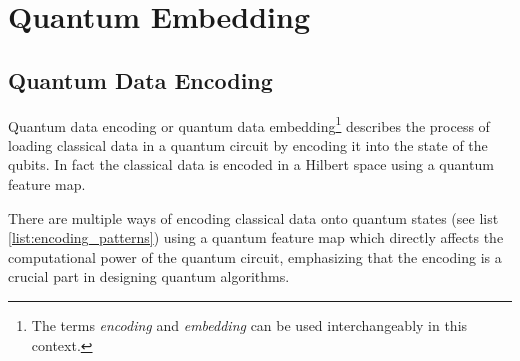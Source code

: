 
\chapter{Quantum Embedding}
\label{chapter:quantum_embedding} %






\section{Quantum Data Encoding}\label{section:quantum_data_encoding}
Quantum data encoding or quantum data embedding\footnote{The terms \textit{encoding} and \textit{embedding} can be used interchangeably in this context.} describes the process of loading classical data in a quantum circuit by encoding it into the state of the qubits. In fact the classical data is encoded in a Hilbert space using a quantum feature map.

There are multiple ways of encoding classical data onto quantum states (see list \ref{list:encoding_patterns}) using a quantum feature map which directly affects the computational power of the quantum circuit, emphasizing that the encoding is a crucial part in designing quantum algorithms.\cite{Quantum_machine_learning_in_feature_Hilbert_spaces_2019,Supervised_learning_with_quantum-enhanced_feature_spaces_2019,Quantum_embeddings_for_machine_learning_2020,PennyLane_QuantumEmbedding,PennyLane_QuantumFeatureMap,schuld2021supervised,leymann2019pattern}\break{}

